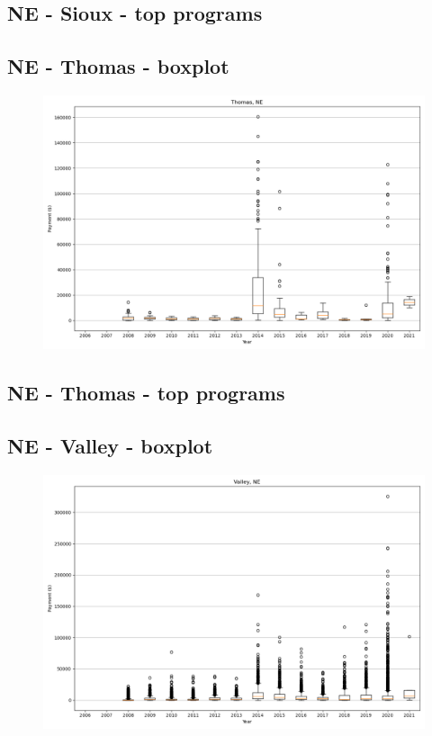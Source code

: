 \subsection*{NE - Sioux - top programs}

\newpage
\subsection*{NE - Thomas - boxplot}
\begin{figure}[h]
\centering
\includegraphics[width=7in]{../output/boxplots/counties/Thomas-NE_boxplot.png}
\end{figure}


\subsection*{NE - Thomas - top programs}

\newpage
\subsection*{NE - Valley - boxplot}
\begin{figure}[h]
\centering
\includegraphics[width=7in]{../output/boxplots/counties/Valley-NE_boxplot.png}
\end{figure}


